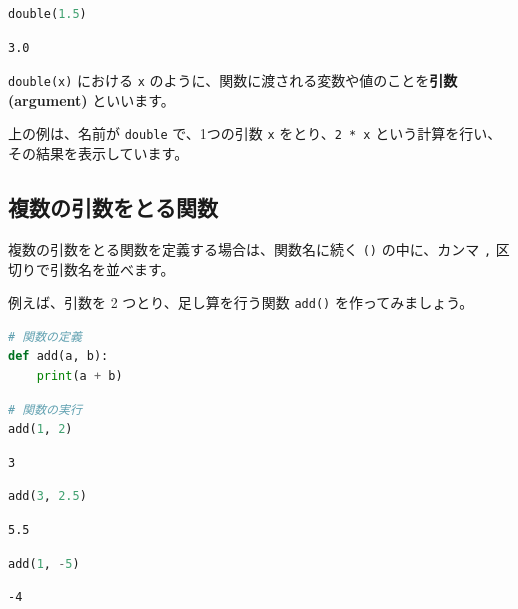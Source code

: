 \begin{lstlisting}[style=codecell,language=Python]
double(1.5)
\end{lstlisting}

\begin{lstlisting}[style=outputcell]
3.0
\end{lstlisting}

\texttt{double(x)} における \texttt{x} のように、関数に渡される変数や値のことを\textbf{引数 (argument)} といいます。

上の例は、名前が \texttt{double} で、1つの引数 \texttt{x} をとり、\texttt{2 * x} という計算を行い、その結果を表示しています。


\subsection{複数の引数をとる関数}


複数の引数をとる関数を定義する場合は、関数名に続く \texttt{()} の中に、カンマ \texttt{,} 区切りで引数名を並べます。


例えば、引数を 2 つとり、足し算を行う関数 \texttt{add()} を作ってみましょう。


\begin{lstlisting}[style=codecell,language=Python]
# 関数の定義
def add(a, b):
    print(a + b)
\end{lstlisting}

\begin{lstlisting}[style=codecell,language=Python]
# 関数の実行
add(1, 2)
\end{lstlisting}

\begin{lstlisting}[style=outputcell]
3
\end{lstlisting}

\begin{lstlisting}[style=codecell,language=Python]
add(3, 2.5)
\end{lstlisting}

\begin{lstlisting}[style=outputcell]
5.5
\end{lstlisting}

\begin{lstlisting}[style=codecell,language=Python]
add(1, -5)
\end{lstlisting}

\begin{lstlisting}[style=outputcell]
-4
\end{lstlisting}

